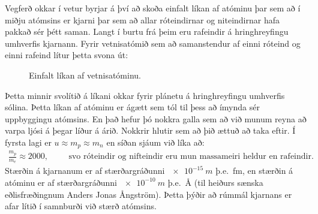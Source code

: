 Vegferð okkar í vetur byrjar á því að skoða einfalt líkan af atóminu þar sem að í miðju atómsins er kjarni þar sem að allar róteindirnar og niteindirnar hafa pakkað sér þétt saman. Langt í burtu frá þeim eru rafeindir á hringhreyfingu umhverfis kjarnann. Fyrir vetnisatómið sem að samanstendur af einni róteind og einni rafeind lítur þetta svona út:


\begin{figure}[H]
    \centering
    \caption{Einfalt líkan af vetnisatóminu.}
\end{figure}

Þetta minnir svolítið á líkani okkar fyrir plánetu á hringhreyfingu umhverfis sólina. Þetta líkan af atóminu er ágætt sem tól til þess að ímynda sér uppbyggingu atómsins. En það hefur þó nokkra galla sem að við munum reyna að varpa ljósi á þegar líður á árið. Nokkrir hlutir sem að þið ættuð að taka eftir. Í fyrsta lagi er $u \approx m_p \approx m_n$ en síðan sjáum við líka að:
\begin{align*}
    \frac{m_p}{m_e} \approx 2000, \hspace{1cm} \text{svo róteindir og nifteindir eru mun massameiri heldur en rafeindir.}
\end{align*}
Stærðin á kjarnanum er af stærðargráðunni $\SI{e-15}{m}$ þ.e.~\si{fm}, en stærðin á atóminu er af stærðargráðunni $\SI{e-10}{m}$ þ.e.~\si{\angstrom} (til heiðurs sænska eðlisfræðingnum Anders Jonas Ångström). Þetta þýðir að rúmmál kjarnans er afar lítið í samnburði við stærð atómsins.\\

